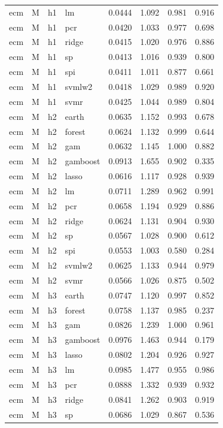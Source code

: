\begin{ThreePartTable}
\begin{longtable}[t]{llclcccc}
ecm & M & h1 & lm & 0.0444 & 1.092 & 0.981 & 0.916\\
ecm & M & h1 & pcr & 0.0420 & 1.033 & 0.977 & 0.698\\
ecm & M & h1 & ridge & 0.0415 & 1.020 & 0.976 & 0.886\\
ecm & M & h1 & sp & 0.0413 & 1.016 & 0.939 & 0.800\\
ecm & M & h1 & spi & 0.0411 & 1.011 & 0.877 & 0.661\\
ecm & M & h1 & svmlw2 & 0.0418 & 1.029 & 0.989 & 0.920\\
ecm & M & h1 & svmr & 0.0425 & 1.044 & 0.989 & 0.804\\
\addlinespace
ecm & M & h2 & earth & 0.0635 & 1.152 & 0.993 & 0.678\\
ecm & M & h2 & forest & 0.0624 & 1.132 & 0.999 & 0.644\\
ecm & M & h2 & gam & 0.0632 & 1.145 & 1.000 & 0.882\\
ecm & M & h2 & gamboost & 0.0913 & 1.655 & 0.902 & 0.335\\
ecm & M & h2 & lasso & 0.0616 & 1.117 & 0.928 & 0.939\\
ecm & M & h2 & lm & 0.0711 & 1.289 & 0.962 & 0.991\\
ecm & M & h2 & pcr & 0.0658 & 1.194 & 0.929 & 0.886\\
ecm & M & h2 & ridge & 0.0624 & 1.131 & 0.904 & 0.930\\
ecm & M & h2 & sp & 0.0567 & 1.028 & 0.900 & 0.612\\
ecm & M & h2 & spi & 0.0553 & 1.003 & 0.580 & 0.284\\
ecm & M & h2 & svmlw2 & 0.0625 & 1.133 & 0.944 & 0.979\\
ecm & M & h2 & svmr & 0.0566 & 1.026 & 0.875 & 0.502\\
\addlinespace
ecm & M & h3 & earth & 0.0747 & 1.120 & 0.997 & 0.852\\
ecm & M & h3 & forest & 0.0758 & 1.137 & 0.985 & 0.237\\
ecm & M & h3 & gam & 0.0826 & 1.239 & 1.000 & 0.961\\
ecm & M & h3 & gamboost & 0.0976 & 1.463 & 0.944 & 0.179\\
ecm & M & h3 & lasso & 0.0802 & 1.204 & 0.926 & 0.927\\
ecm & M & h3 & lm & 0.0985 & 1.477 & 0.955 & 0.986\\
ecm & M & h3 & pcr & 0.0888 & 1.332 & 0.939 & 0.932\\
ecm & M & h3 & ridge & 0.0841 & 1.262 & 0.903 & 0.919\\
ecm & M & h3 & sp & 0.0686 & 1.029 & 0.867 & 0.536\\

\end{longtable}
\end{ThreePartTable}
